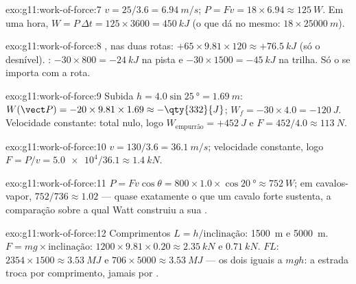 \begin{solution}{exo:g11:work-of-force:7}
$v = 25/3.6 = \qty{6.94}{m/s}$;
$P = Fv = 18 \times 6.94 \approx \qty{125}{W}$. Em uma hora,
$W = P\,\Delta t = 125 \times 3600 = \qty{450}{kJ}$ (o que dá no mesmo:
$18 \times \qty{25000}{m}$).
\end{solution}

\begin{solution}{exo:g11:work-of-force:8}
, nas duas rotas:
$+65 \times 9.81 \times 120 \approx +\qty{76.5}{kJ}$ (só o desnível).
: $-30 \times 800 = -\qty{24}{kJ}$ na pista e
$-30 \times 1500 = -\qty{45}{kJ}$ na trilha. Só o  se importa com a
rota.
\end{solution}

\begin{solution}{exo:g11:work-of-force:9}
Subida $h = 4.0\sin\qty{25}{\degree} = \qty{1.69}{m}$:
$W(\vect P) = -20 \times 9.81 \times 1.69 \approx -\qty{332}{J}$;
$W_f = -30 \times 4.0 = -\qty{120}{J}$. Velocidade constante: 
total nulo, logo $W_{\text{empurrão}} = +\qty{452}{J}$ e
$F = 452/4.0 \approx \qty{113}{N}$.
\end{solution}

\begin{solution}{exo:g11:work-of-force:10}
$v = 130/3.6 = \qty{36.1}{m/s}$; velocidade constante, logo
$F = P/v = \num{5.0e4}/36.1 \approx \qty{1.4}{kN}$.
\end{solution}

\begin{solution}{exo:g11:work-of-force:11}
$P = Fv\cos\theta = 800 \times 1.0 \times \cos\qty{20}{\degree}
\approx \qty{752}{W}$; em cavalos-vapor, $752/736 \approx \num{1.02}$ ---
quase exatamente o que um cavalo forte sustenta, a comparação sobre a
qual Watt construiu a sua .
\end{solution}

\begin{solution}{exo:g11:work-of-force:12}
Comprimentos $L = h/\text{inclinação}$: \qty{1500}{m} e \qty{5000}{m}.
 $F = mg \times \text{inclinação}$:
$1200 \times 9.81 \times 0.20 \approx \qty{2.35}{kN}$ e
$\qty{0.71}{kN}$.  $FL$:
$2354 \times 1500 \approx \qty{3.53}{MJ}$ e
$706 \times 5000 \approx \qty{3.53}{MJ}$ --- os dois iguais a $mgh$: a
estrada troca  por comprimento, jamais por .
\end{solution}

